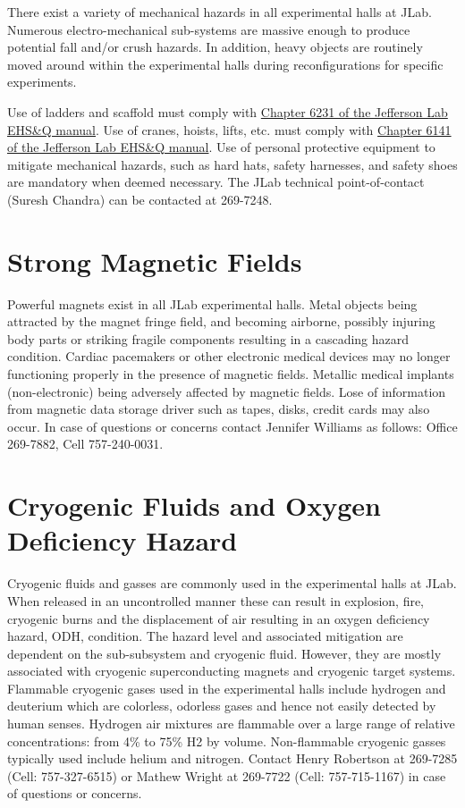 	There exist a variety of mechanical hazards in all experimental halls at JLab. 
Numerous electro-mechanical sub-systems are massive enough to produce potential fall 
and/or crush hazards.  In addition, heavy objects are routinely moved around within 
the experimental halls during reconfigurations for specific experiments. 

Use of ladders and scaffold must comply 
with \href{http://www.jlab.org/ehs/ehsmanual/manual/6132.html}{Chapter 6231 of the 
Jefferson Lab EHS\&Q manual}.
Use of cranes, hoists, lifts, etc. must comply with
\href{http://www.jlab.org/ehs/ehsmanual/manual/6141.html}{Chapter 6141 of the 
Jefferson Lab EHS\&Q manual}. 
Use of personal protective equipment 
to mitigate mechanical hazards, such as hard hats, safety harnesses, and safety 
shoes are mandatory when deemed necessary.
The JLab technical point-of-contact (Suresh Chandra) can be contacted at 269-7248.

\section{Strong Magnetic Fields}

	Powerful magnets exist in all JLab experimental halls. Metal objects being attracted 
by the magnet fringe field, and becoming airborne, possibly injuring body parts or striking 
fragile components resulting in a cascading hazard condition. Cardiac pacemakers or other 
electronic medical devices may no longer functioning properly in the presence of magnetic fields. 
Metallic medical implants (non-electronic) being adversely affected by magnetic fields. Lose of 
information from magnetic data storage driver such as tapes, disks, credit cards may also occur. 
In case of questions or concerns
contact Jennifer Williams as follows: Office 269-7882, Cell 757-240-0031.

\section{Cryogenic Fluids and Oxygen Deficiency Hazard}

	Cryogenic fluids and gasses are commonly used in the experimental halls at JLab. 
When released in an uncontrolled manner these can result in explosion, fire, cryogenic 
burns and the displacement of air resulting in an oxygen deficiency hazard, ODH, condition. The hazard level and 
associated mitigation are dependent on the sub-subsystem and cryogenic fluid. However, 
they are mostly associated with cryogenic superconducting magnets and cryogenic target systems. 
Flammable cryogenic gases used in the experimental halls include hydrogen and deuterium which 
are colorless, odorless gases and hence not easily detected by human senses. Hydrogen air 
mixtures are flammable over a large range of relative concentrations: from 4\% to 75\% H2 by volume. 
Non-flammable cryogenic gasses typically used include helium and nitrogen.  Contact Henry Robertson at
269-7285 (Cell: 757-327-6515) or Mathew Wright at 269-7722 (Cell: 757-715-1167) in case of questions or concerns.   

